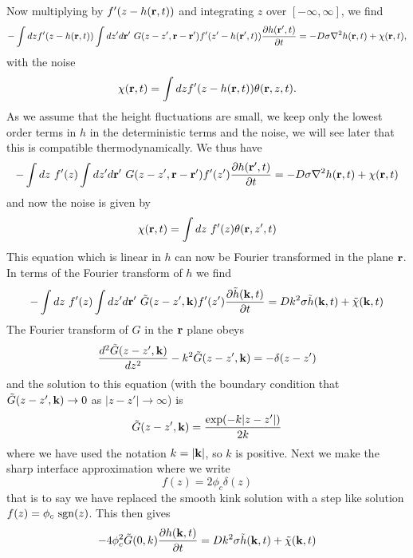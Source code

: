 Now multiplying by $f'(z-h({\bf r},t))$ and integrating $z$ over $[-\infty,\infty]$, we find
\begin{align}
-\int dz f'(z-h({\bf r},t))\int dz'd{\bf r}'\ G(z-z',{\bf r}-{\bf r}') f'(z'-h({\bf r}',t))\frac{\partial h({\bf r}',t)}{\partial t} = -D\sigma \nabla^2 h({\bf r},t) + \chi({\bf r},t),
\end{align}
with the noise
\begin{equation}
\chi({\bf r},t)= \int dz f'(z-h({\bf r},t)) \theta({\bf r},z,t).
\end{equation}
As we assume that the height fluctuations are small, we keep only the lowest order terms in $h$ in the deterministic terms and the noise, we will see later that this is compatible thermodynamically. We thus have
\begin{equation}
-\int dz \ f'(z)\int dz'd{\bf r}'\ G(z-z',{\bf r}-{\bf r}') f'(z')\frac{\partial h({\bf r}',t)}{\partial t} = -D\sigma \nabla^2 h({\bf r},t) + \chi({\bf r},t)
\end{equation}
and now the noise is given by
\begin{equation}
\chi({\bf r},t)= \int dz\ f'(z) \theta({\bf r},z',t)
\end{equation}
This equation which is linear in $h$ can now be Fourier transformed in the plane ${\bf r}$. In terms of the Fourier transform of $h$ we find
\begin{equation}
-\int dz \ f'(z)\int dz'd\br'\ \tilde G(z-z',\bk) f'(z')\frac{\partial\tilde h(\bk,t)}{\partial t} = Dk^2\sigma \tilde h(\bk,t) + \tilde \chi(\bk,t)
\label{bstep}
\end{equation}
The Fourier transform of $G$ in the ${\bf r}$ plane obeys
\begin{equation}
\frac{d^2 \tilde G(z-z',{\bf k} )}{dz^2}-k^2 \tilde G(z-z',{\bf k} )=-\delta(z-z')
\end{equation}
and the solution to this equation (with the boundary condition that $\tilde G(z-z',{\bf k} )\to 0$ as $|z-z'|\to\infty$) is
\begin{equation}
\tilde G(z-z',{\bf k}) = \frac{\exp(-k|z-z'|)}{2k}
\end{equation}
where we have used the notation $k=|{\bf k}|$, so $k$ is positive. Next we make the sharp interface approximation where we write
\begin{equation}
f(z) = 2\phi_c \delta(z)
\label{sharp}
\end{equation}
that is to say we have replaced the smooth kink solution with a step like solution
$f(z) = \phi_c\ {\rm sgn}(z)$. This then gives
\begin{equation}
-4\phi_c^2 \tilde G(0,k) \frac{\partial h({\bf k},t)}{\partial t} = Dk^2\sigma \tilde h({\bf k},t) + \tilde \chi({\bf k},t)
\end{equation}
